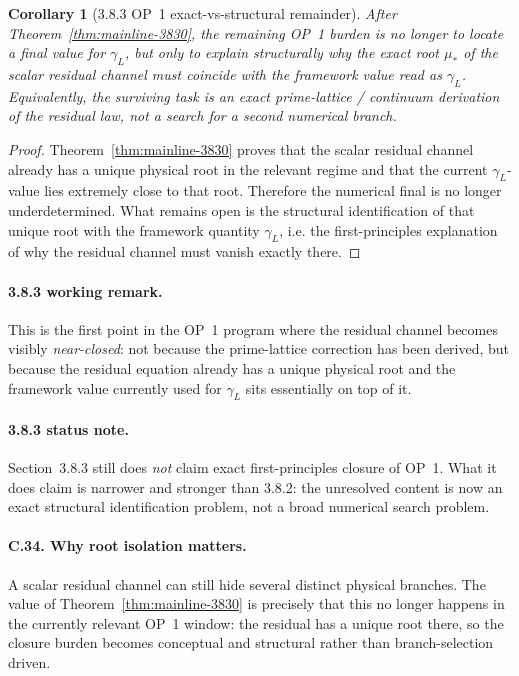 \documentclass[12pt,a4paper]{article}
\newtheorem{corollary}[theorem]{Corollary}
\begin{document}
\begin{corollary}[3.8.3 OP~1 exact-vs-structural remainder]
\label{cor:mainline-3830}
After Theorem~\ref{thm:mainline-3830}, the remaining OP~1 burden is no longer to locate a final value for \(\gamma_L\), but only to explain structurally why the exact root \(\mu_\ast\) of the scalar residual channel must coincide with the framework value read as \(\gamma_L\). Equivalently, the surviving task is an exact prime-lattice / continuum derivation of the residual law, not a search for a second numerical branch.
\end{corollary}

\begin{proof}
Theorem~\ref{thm:mainline-3830} proves that the scalar residual channel already has a unique physical root in the relevant regime and that the current \(\gamma_L\)-value lies extremely close to that root. Therefore the numerical final is no longer underdetermined. What remains open is the structural identification of that unique root with the framework quantity \(\gamma_L\), i.e. the first-principles explanation of why the residual channel must vanish exactly there.
\end{proof}

\paragraph{3.8.3 working remark.}
This is the first point in the OP~1 program where the residual channel becomes visibly \emph{near-closed}: not because the prime-lattice correction has been derived, but because the residual equation already has a unique physical root and the framework value currently used for \(\gamma_L\) sits essentially on top of it.

\paragraph{3.8.3 status note.}
Section~3.8.3 still does \emph{not} claim exact first-principles closure of OP~1. What it does claim is narrower and stronger than 3.8.2: the unresolved content is now an exact structural identification problem, not a broad numerical search problem.

\paragraph{C.34. Why root isolation matters.}
A scalar residual channel can still hide several distinct physical branches. The value of Theorem~\ref{thm:mainline-3830} is precisely that this no longer happens in the currently relevant OP~1 window: the residual has a unique root there, so the closure burden becomes conceptual and structural rather than branch-selection driven.
\end{document}
